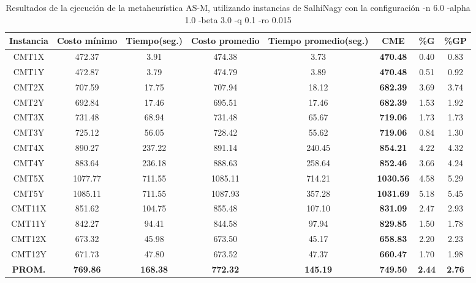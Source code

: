 \begin{table}[h]
\caption{Resultados de la ejecución de la metaheurística AS-M, utilizando instancias de SalhiNagy con la configuración -n 6.0 -alpha 1.0 -beta 3.0 -q 0.1 -ro 0.015}
\centering
\small
\begin{tabular}{c c c c c c c c}
\hline\hline
Instancia & Costo mínimo & Tiempo(seg.) & Costo promedio & Tiempo promedio(seg.) & CME & \%G & \%GP \\ [0.5ex]
\hline
CMT1X & 472.37 & 3.91 & 
474.38 & 3.73 & \bf{470.48} & 
0.40 & 0.83\\CMT1Y & 472.87 & 3.79 & 
474.79 & 3.89 & \bf{470.48} & 
0.51 & 0.92\\CMT2X & 707.59 & 17.75 & 
707.94 & 18.12 & \bf{682.39} & 
3.69 & 3.74\\CMT2Y & 692.84 & 17.46 & 
695.51 & 17.46 & \bf{682.39} & 
1.53 & 1.92\\CMT3X & 731.48 & 68.94 & 
731.48 & 65.67 & \bf{719.06} & 
1.73 & 1.73\\CMT3Y & 725.12 & 56.05 & 
728.42 & 55.62 & \bf{719.06} & 
0.84 & 1.30\\CMT4X & 890.27 & 237.22 & 
891.14 & 240.45 & \bf{854.21} & 
4.22 & 4.32\\CMT4Y & 883.64 & 236.18 & 
888.63 & 258.64 & \bf{852.46} & 
3.66 & 4.24\\CMT5X & 1077.77 & 711.55 & 
1085.11 & 714.21 & \bf{1030.56} & 
4.58 & 5.29\\CMT5Y & 1085.11 & 711.55 & 
1087.93 & 357.28 & \bf{1031.69} & 
5.18 & 5.45\\CMT11X & 851.62 & 104.75 & 
855.48 & 107.10 & \bf{831.09} & 
2.47 & 2.93\\CMT11Y & 842.27 & 94.41 & 
844.58 & 97.94 & \bf{829.85} & 
1.50 & 1.78\\CMT12X & 673.32 & 45.98 & 
673.50 & 45.17 & \bf{658.83} & 
2.20 & 2.23\\CMT12Y & 671.73 & 47.80 & 
673.52 & 47.37 & \bf{660.47} & 
1.70 & 1.98\\\bf{PROM.} & 
\bf{769.86} & \bf{168.38} & \bf{772.32} & \bf{145.19} & \bf{749.50} & \bf{2.44} & \bf{2.76}\\[1ex]\hline
\end{tabular}
\label{table:nonlin}
\end{table}
